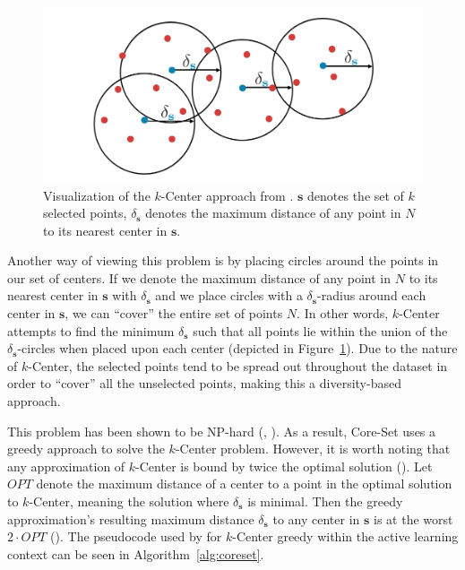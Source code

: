 \documentclass[english,bachelor,ul]{webisthesis} %
\begin{document}
\begin{figure}[htbp]
    \centering
    \includegraphics[width=1\textwidth]{img/core-set.png}
    \caption{Visualization of the $k$-Center approach from \cite{DBLP:conf/iclr/SenerS18}. $ \mathbf{s} $ denotes the set of $ k $ selected points, $ \delta_{\mathbf{s}} $ denotes the maximum distance of any point in $ N $ to its nearest center in $ \mathbf{s} $.}
    \label{fig:coreset}
\end{figure}

Another way of viewing this problem is by placing circles around the points in our set of centers. If we denote the maximum distance of any point in $ N $ to its nearest center in $ \mathbf{s} $ with $ \delta_{\mathbf{s}} $ and we place circles with a $ \delta_{\mathbf{s}} $-radius around each center in $ \mathbf{s} $, we can ``cover'' the entire set of points $ N $. In other words, $k$-Center attempts to find the minimum $ \delta_{\mathbf{s}} $ such that all points lie within the union of the $ \delta_{\mathbf{s}} $-circles when placed upon each center (depicted in Figure~\ref{fig:coreset}). Due to the nature of $k$-Center, the selected points tend to be spread out throughout the dataset in order to ``cover'' all the unselected points, making this a diversity-based approach. 

This problem has been shown to be NP-hard (\cite{DBLP:journals/dam/HsuN79}, \cite{DBLP:journals/anor/Hochbaum84}). As a result, Core-Set uses a greedy approach to solve the $k$-Center problem. However, it is worth noting that any approximation of $k$-Center is bound by twice the optimal solution (\cite{DBLP:journals/dam/HsuN79}). Let $ OPT $ denote the maximum distance of a center to a point in the optimal solution to $k$-Center, meaning the solution where $\delta_{\mathbf{s}} $ is minimal. Then the greedy approximation's resulting maximum distance $ \delta_{\mathbf{s}} $ to any center in $ \mathbf{s} $ is at the worst $ 2 \cdot OPT $ (\cite{mountkcenter}). The pseudocode used by \cite{DBLP:conf/iclr/SenerS18} for $k$-Center greedy within the active learning context can be seen in Algorithm~\ref{alg:coreset}.
\end{document}
